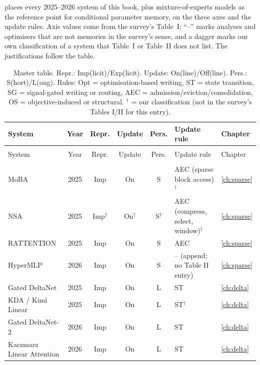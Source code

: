  places every 2025--2026 system of this book, plus mixture-of-experts models as
the reference point for conditional parameter memory, on the three axes and the update rules. Axis
values come from the survey's Table~I; ``--'' marks analyses and optimisers that are not memories in
the survey's sense, and a dagger marks our own classification of a system that Table~I or Table~II
does not list. The justifications follow the table.

\begingroup
\footnotesize
\setlength{\tabcolsep}{4pt}
\begin{longtable}{@{}>{\raggedright\arraybackslash}p{4.1cm}c c c c >{\raggedright\arraybackslash}p{4.2cm}l@{}}
\caption{Master table. Repr.: Imp(licit)/Exp(licit). Update: On(line)/Off(line). Pers.: S(hort)/L(ong).
Rules: Opt = optimisation-based writing, ST = state transition, SG = signal-gated writing or
routing, AEC = admission/eviction/consolidation, OS = objective-induced or structural.
$^{\dagger}$ = our classification (not in the survey's Tables I/II for this entry).}
\label{tab:c02-master}\\
\toprule
System & Year & Repr. & Update & Pers. & Update rule & Chapter \\
\midrule
\endfirsthead
\multicolumn{7}{@{}l}{\small\itshape \Cref{tab:c02-master}, continued}\\
\toprule
System & Year & Repr. & Update & Pers. & Update rule & Chapter \\
\midrule
\endhead
\midrule
\multicolumn{7}{r@{}}{\small\itshape continued on next page}\\
\endfoot
\bottomrule
\endlastfoot
MoBA & 2025 & Imp & On & S & AEC (sparse block access)$^{\dagger}$ & \cref{ch:sparse} \\
NSA & 2025 & Imp$^{\dagger}$ & On$^{\dagger}$ & S$^{\dagger}$ & AEC (compress, select, window)$^{\dagger}$ & \cref{ch:sparse} \\
RATTENTION & 2025 & Imp & On & S & AEC & \cref{ch:sparse} \\
HyperMLP & 2026 & Imp & On & S & -- (append; no Table II entry) & \cref{ch:sparse} \\
\midrule
Gated DeltaNet & 2025 & Imp & On & L & ST & \cref{ch:delta} \\
KDA / Kimi Linear & 2025 & Imp & On & L & ST$^{\dagger}$ & \cref{ch:delta} \\
Gated DeltaNet-2 & 2026 & Imp & On & L & ST & \cref{ch:delta} \\
Kaczmarz Linear Attention & 2026 & Imp & On & L & ST & \cref{ch:delta} \\

\end{longtable}
